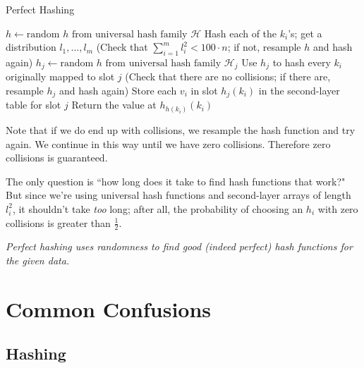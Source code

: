 \documentclass[11pt]{article}
\begin{document}
{\begin{algorithm}
\caption{Perfect Hashing}
\begin{algorithmic}[1]
\State $h \gets \text{random $h$ from universal hash family $\mathcal{H}$}$
\State Hash each of the $k_i$'s; get a distribution $l_1, ..., l_m$
\State \indent (Check that $\sum_{i = 1}^m l_i^2 < 100 \cdot n$; if not, resample $h$ and hash again)
  \State $h_j \gets \text{random $h$ from universal hash family $\mathcal{H}_j$}$
  \State Use $h_j$ to hash every $k_i$ originally mapped to slot $j$
  \State \indent (Check that there are no collisions; if there are, resample $h_j$ and hash again)
  \State Store each $v_i$ in slot $h_j(k_i)$ in the second-layer table for slot $j$
\EndFor
\EndProcedure
{}
\State Return the value at $h_{h(k_i)}(k_i)$
\EndProcedure
\end{algorithmic}
\end{algorithm}

Note that if we do end up with collisions, we resample the hash function and try again. We continue in this way until we have zero collisions. Therefore zero collisions is guaranteed.

The only question is ``how long does it take to find hash functions that work?" But since we're using universal hash functions and second-layer arrays of length $l_i^2$, it shouldn't take \textit{too} long; after all, the probability of choosing an $h_i$ with zero collisions is greater than $\frac{1}{2}$.

\textit{Perfect hashing uses randomness to find good (indeed perfect) hash functions for the given data.}
}

\section*{Common Confusions}

\subsection*{Hashing}
\end{document}
